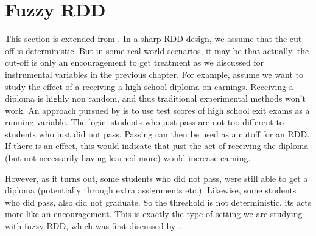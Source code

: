 \documentclass[11pt]{exam}
\begin{document}
\section{Fuzzy RDD}
This section is extended from \citet{chazal2024causalcoursenotes}.
In a sharp RDD design, we assume that the cut-off is deterministic. But in some real-world scenarios, it may be that actually, the cut-off is only an encouragement to get treatment as we discussed for instrumental variables in the previous chapter. For example, assume we want to study the effect of a receiving a high-school diploma on earnings. Receiving a diploma is highly non random, and thus traditional experimental methods won't work. An approach pursued by \citet{clark2014signaling} is to use test scores of high school exit exams as a running variable. The logic: students who just pass are not too different to students who just did not pass.  Passing can then be used as a cutoff for an RDD. If there is an effect, this would indicate that just the act of receiving the diploma (but not necessarily having learned more) would increase earning.

However, as it turns out, some students who did not pass, were still able to get a diploma (potentially through extra assignments etc.). Likewise, some students who did pass, also did not graduate. So the threshold is not deterministic, its acts more like an encouragement. This is exactly the type of setting we are studying with fuzzy RDD, which was first discussed by \citet{hahn2001identification}.
\end{document}
